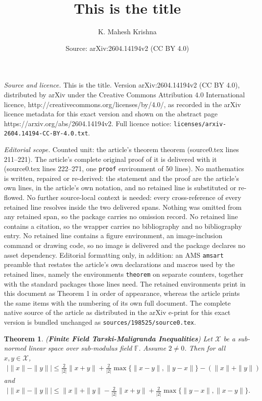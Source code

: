 \documentclass[10pt,a4paper]{amsart}
\title{This is the title}
\author{K. Mahesh Krishna}
\date{Source: arXiv:2604.14194v2 (CC BY 4.0)}
\newtheorem{theorem}{Theorem}
\begin{document}
\maketitle

\noindent\emph{Source and licence.} This is the title. Version arXiv:2604.14194v2 (CC BY 4.0), distributed by arXiv under the Creative Commons Attribution 4.0 International licence, http://creativecommons.org/licenses/by/4.0/, as recorded in the arXiv licence metadata for this exact version and shown on the abstract page https://arxiv.org/abs/2604.14194v2. Full licence notice: \texttt{licenses/arxiv-2604.14194-CC-BY-4.0.txt}.\par\smallskip

\noindent\textit{Editorial scope.} Counted unit: the article's theorem theorem (source0.tex lines 211--221). The article's complete original proof of it is delivered with it (source0.tex lines 222--271, one \texttt{proof} environment of 50 lines). No mathematics is written, repaired or re-derived: the statement and the proof are the article's own lines, in the article's own notation, and no retained line is substituted or re-flowed.  No further source-local context is needed: every cross-reference of every retained line resolves inside the two delivered spans.  Nothing was omitted from any retained span, so the package carries no omission record.  No retained line contains a citation, so the wrapper carries no bibliography and no bibliography entry.  No retained line contains a figure environment, an image-inclusion command or drawing code, so no image is delivered and the package declares no asset dependency.  Editorial formatting only, in addition: an AMS \texttt{amsart} preamble that restates the article's own declarations and macros used by the retained lines, namely the environments \texttt{theorem} on separate counters, together with the standard packages those lines need.  The retained environments print in this document as Theorem 1 in order of appearance, whereas the article prints the same items with the numbering of its own full document.  The complete native source of the article as distributed in the arXiv e-print for this exact version is bundled unchanged as \texttt{sources/198525/source0.tex}.
  \begin{theorem}
  	(\textbf{Finite Field Tarski-Maligranda Inequalities})
  	Let $\mathcal{X}$ be a sub-normed linear space over sub-modulus field $\mathbb{F}$. Assume $2\neq 0$. Then for all $x, y \in \mathcal{X}$, 
  	\begin{align*}
  		\bigg|\|x\|-\|y\|\bigg|\leq  \frac{2}{|2|}\|x+y\|+\frac{2}{|2|}\max\{\|x-y\|, \|y-x\|\}-(\|x\|+\|y\|)
  	\end{align*}
  	and 
  \begin{align*}
  	\bigg|\|x\|-\|y\|\bigg|\leq \|x\|+\|y\|-\frac{2}{|2|}\|x+y\|+\frac{2}{|2|}\max\{\|y-x\|, \|x-y\|\}.
  \end{align*}
  \end{theorem}
\end{document}
